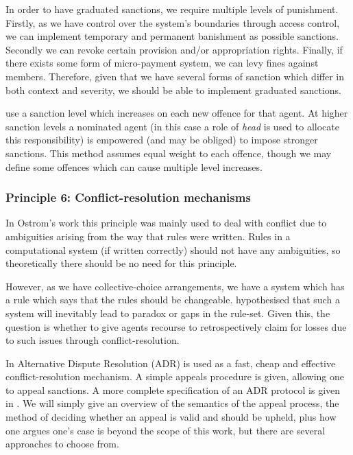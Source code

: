 In order to have graduated sanctions, we require multiple levels of punishment. 
Firstly, as we have control over the system's boundaries through access control, we can implement temporary and permanent banishment as possible sanctions. 
Secondly we can revoke certain provision and/or appropriation rights. Finally, if there exists some form of micro-payment system, we can levy fines against members. 
Therefore, given that we have several forms of sanction which differ in both context and severity, we should be able to implement graduated sanctions. 

 use a sanction level which increases on each new offence for that agent.
At higher sanction levels a nominated agent (in this case a role of \emph{head} is used to allocate this responsibility) is empowered (and may be obliged) to impose stronger sanctions. 
This method assumes equal weight to each offence, though we may define some offences which can cause multiple level increases. 

\subsubsection*{Principle 6: Conflict-resolution mechanisms}

In Ostrom's work this principle was mainly used to deal with conflict due to ambiguities arising from the way that rules were written. Rules in a computational system (if written correctly) should not have any ambiguities, so theoretically there should be no need for this principle.

However, as we have collective-choice arrangements, we have a system which has a rule which says that the rules should be changeable.  hypothesised that such a system will inevitably lead to paradox or gaps in the rule-set. 
Given this, the question is whether to give agents recourse to retrospectively claim for losses due to such issues through conflict-resolution.


In  Alternative Dispute Resolution (ADR) is used as a fast, cheap and effective conflict-resolution mechanism. A simple appeals procedure is given, allowing one to appeal sanctions. A more complete specification of an ADR protocol is given in . 
We will simply give an overview of the semantics of the appeal process, the method of deciding whether an appeal is valid and should be upheld, plus how one argues one's case is beyond the scope of this work, but there are several approaches to choose from.

